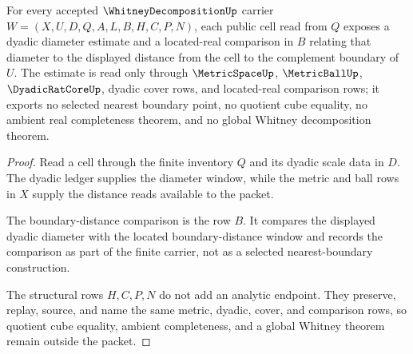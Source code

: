 \begin{theorem}
\label{thm:whitney-decomposition-boundary-distance-control}
For every accepted $\WhitneyDecompositionUp$ carrier $W=(X,U,D,Q,A,L,B,H,C,P,N)$, each public cell read from $Q$ exposes a dyadic diameter estimate and a located-real comparison in $B$ relating that diameter to the displayed distance from the cell to the complement boundary of $U$. The estimate is read only through $\MetricSpaceUp$, $\MetricBallUp$, $\DyadicRatCoreUp$, dyadic cover rows, and located-real comparison rows; it exports no selected nearest boundary point, no quotient cube equality, no ambient real completeness theorem, and no global Whitney decomposition theorem.
\end{theorem}
\begin{proof}
Read a cell through the finite inventory $Q$ and its dyadic scale data in $D$. The dyadic ledger supplies the diameter window, while the metric and ball rows in $X$ supply the distance reads available to the packet.

The boundary-distance comparison is the row $B$. It compares the displayed dyadic diameter with the located boundary-distance window and records the comparison as part of the finite carrier, not as a selected nearest-boundary construction.

The structural rows $H,C,P,N$ do not add an analytic endpoint. They preserve, replay, source, and name the same metric, dyadic, cover, and comparison rows, so quotient cube equality, ambient completeness, and a global Whitney theorem remain outside the packet.
\end{proof}



